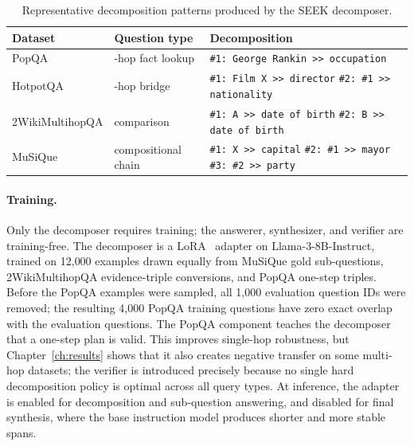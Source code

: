 \begin{table}[htbp]
    \centering
    \caption[Decomposition Patterns by Dataset]{Representative decomposition patterns produced by the SEEK decomposer.}
    \label{tab:decomp-examples}

    \setlength{\tabcolsep}{6pt}
    \small
    \begin{tabular}{ l >{\raggedright\arraybackslash}p{4cm} >{\raggedright\arraybackslash}p{6cm} }
        \toprule
        Dataset & Question type & Decomposition \\
        \midrule
        PopQA & 1-hop fact lookup & \texttt{\#1: George Rankin >> occupation} \\
        \addlinespace
        HotpotQA & 2-hop bridge & \texttt{\#1: Film X >> director} \newline \texttt{\#2: \#1 >> nationality} \\
        \addlinespace
        2WikiMultihopQA & comparison & \texttt{\#1: A >> date of birth} \newline \texttt{\#2: B >> date of birth} \\
        \addlinespace
        MuSiQue & compositional chain & \texttt{\#1: X >> capital} \newline \texttt{\#2: \#1 >> mayor} \newline \texttt{\#3: \#2 >> party} \\
        \bottomrule
    \end{tabular}
\end{table}

\paragraph{Training.} Only the decomposer requires training; the answerer, synthesizer, and verifier are training-free. The decomposer is a LoRA~\cite{lora} adapter on Llama-3-8B-Instruct, trained on 12{,}000 examples drawn equally from MuSiQue gold sub-questions, 2WikiMultihopQA evidence-triple conversions, and PopQA one-step triples. Before the PopQA examples were sampled, all 1{,}000 evaluation question IDs were removed; the resulting 4{,}000 PopQA training questions have zero exact overlap with the evaluation questions. The PopQA component teaches the decomposer that a one-step plan is valid. This improves single-hop robustness, but Chapter~\ref{ch:results} shows that it also creates negative transfer on some multi-hop datasets; the verifier is introduced precisely because no single hard decomposition policy is optimal across all query types. At inference, the adapter is enabled for decomposition and sub-question answering, and disabled for final synthesis, where the base instruction model produces shorter and more stable spans.

